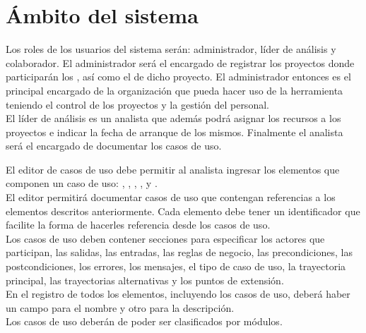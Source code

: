 \section{Ámbito del sistema}
Los roles de los usuarios del sistema serán: administrador, líder de análisis y colaborador. El administrador será el encargado 
de registrar los proyectos donde participarán los , así como el  de dicho proyecto. El 
administrador entonces es el principal encargado de la organización que pueda hacer uso de la herramienta teniendo el control de los proyectos y la gestión del 
personal.\\

El líder de análisis es un analista que además podrá asignar los recursos a los proyectos e indicar la fecha de arranque de los mismos. Finalmente
el analista será el encargado de documentar los casos de uso.

El editor de casos de uso debe permitir al analista ingresar los elementos que componen un caso de uso: , , 
, ,  y .\\

El editor permitirá documentar casos de uso que contengan referencias a los elementos descritos anteriormente.
Cada elemento debe tener un identificador que facilite la forma de hacerles referencia desde los casos de uso.\\

Los casos de uso deben contener secciones para especificar los actores que participan, las salidas, las entradas, las reglas de negocio,
las precondiciones, las postcondiciones, los errores, los mensajes, el tipo de
caso de uso, la trayectoria principal, las trayectorias alternativas y los puntos de extensión.\\

En el registro de todos los elementos, incluyendo los casos de uso, deberá haber un campo para el nombre y otro para la descripción.\\

Los casos de uso deberán de poder ser clasificados por módulos.

